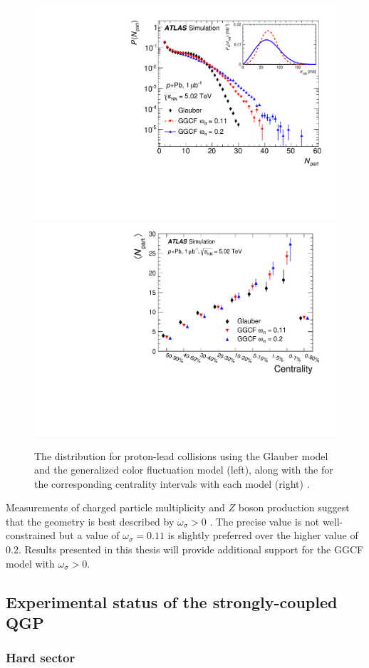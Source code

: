\begin{figure}[t]
  \includegraphics[width=0.49\linewidth]{ggcf_prob_dist.pdf}
  \includegraphics[width=0.49\linewidth]{npart_ggcf.pdf}
  \caption{The \Npart distribution for proton-lead collisions using the Glauber model and the generalized color fluctuation model (left), along with the \avgNpart for the corresponding centrality intervals with each model (right) \cite{HION-2012-15}.}
  \label{fig:ggcf_npart}
\end{figure}

Measurements of charged particle multiplicity and $Z$ boson production suggest that the geometry is best described by $\omega_\sigma > 0$ \cite{HION-2012-15,HION-2013-09}.
The precise value is not well-constrained but a value of $\omega_\sigma = 0.11$ is slightly preferred over the higher value of $0.2$.
Results presented in this thesis will provide additional support for the \ac{GGCF} model with $\omega_\sigma > 0$.


\subsection{Experimental status of the strongly-coupled QGP}

\subsubsection{Hard sector}

